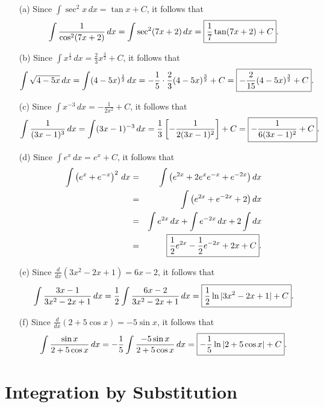 \documentclass[12pt]{article}
\newenvironment{examples}{\noindent{\bf Examples }}{\vspace{0mm}}
\newenvironment{solution}{\noindent{\it Solution}}{\vspace{2mm}}
\newcommand{\ds}{\displaystyle}
\begin{document}
\begin{enumerate}
\begin{examples}
\begin{solution}
\begin{enumerate}
\item[(a)]
Since $\ds \int \sec^2 x \, dx = \tan x + C$, it follows that
$$
\int \frac{1}{\cos^2(7x + 2)} \, dx = \int \sec^2(7x + 2) \, dx = \fbox{$\ds \frac{1}{7}\tan(7x+2) + C$}.
$$
\item[(b)]
Since $\ds \int x^{\frac{1}{2}} \, dx = \frac{2}{3}x^{\frac{3}{2}} + C$, it follows that
$$
\int \sqrt{4 - 5x} \, dx = \int (4 - 5x)^{\frac{1}{2}} \, dx = -\frac{1}{5} \cdot \frac{2}{3}(4 - 5x)^{\frac{3}{2}} + C = \fbox{$\ds -\frac{2}{15}(4 - 5x)^{\frac{3}{2}} + C$}.
$$
\item[(c)]
Since $\ds \int x^{-3} \, dx = -\frac{1}{2x^2} + C$, it follows that
$$
\int \frac{1}{(3x - 1)^3} \, dx = \int (3x - 1)^{-3} \, dx = \frac{1}{3}\left[-\frac{1}{2(3x - 1)^2}\right] + C = \fbox{$\ds -\frac{1}{6(3x-1)^2} + C$}.
$$
\item[(d)]
Since $\ds \int e^x \, dx = e^x + C$, it follows that
\begin{eqnarray*}
\int \left(e^x + e^{-x}\right)^2 \, dx & = & \int \left(e^{2x} + 2e^x e^{-x} + e^{-2x}\right) dx \\
& = & \int \left(e^{2x} + e^{-2x} + 2\right) dx \\
& = & \int e^{2x} \, dx + \int e^{-2x} \, dx + 2\int dx \\
& = & \fbox{$\ds \frac{1}{2}e^{2x} - \frac{1}{2}e^{-2x} + 2x + C$}.
\end{eqnarray*}
\item[(e)]
Since $\ds \frac{d}{dx}\left(3x^2 - 2x + 1\right) = 6x - 2$, it follows that
$$
\int \frac{3x-1}{3x^2 - 2x + 1} \, dx = \frac{1}{2}\int \frac{6x-2}{3x^2 - 2x + 1} \, dx = \fbox{$\ds \frac{1}{2}\ln|3x^2 - 2x + 1| + C$}.
$$
\item[(f)]
Since $\ds \frac{d}{dx}(2 + 5\cos x) = -5\sin x$, it follows that
$$
\int \frac{\sin x}{2 + 5\cos x} \, dx = -\frac{1}{5}\int \frac{-5\sin x}{2 + 5\cos x} \, dx = \fbox{$\ds -\frac{1}{5}\ln|2 + 5\cos x| + C$}.
$$
\end{enumerate}
\end{solution}
\end{examples}
\end{enumerate}

\section{Integration by Substitution}
\end{document}
